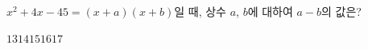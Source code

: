 $x^2+4x-45=(x+a)(x+b)$일 때, 상수 $a$, $b$에 대하여 $a-b$의 값은? 
\begin{choices32}{$13$}{$14$}{$15$}{$16$}{$17$}\end{choices32}

